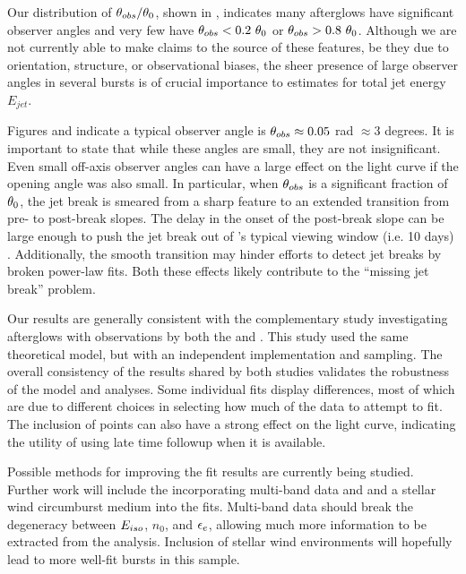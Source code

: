 Our distribution of $\theta_{obs}/\theta_0$, shown in , indicates many afterglows have significant observer angles and very few have $\thobs < 0.2\ \thO$ or $\thobs > 0.8\ \thO$.  Although we are not currently able to make claims to the source of these features, be they due to orientation, structure, or observational biases, the sheer presence of large observer angles in several bursts is of crucial importance to estimates for total jet energy $E_{jet}$.  

Figures  and  indicate a typical observer angle is $\theta_{obs} \approx 0.05$ rad $\approx 3$ degrees.  It is important to state that while these angles are small, they are not insignificant.  Even small off-axis observer angles can have a large effect on the light curve if the opening angle was also small.  In particular, when $\theta_{obs}$ is a significant fraction of $\theta_0$, the jet break is smeared from a sharp feature to an extended transition from pre- to post-break slopes.  The delay in the onset of the post-break slope can be large enough to push the jet break out of \swift{}'s typical viewing window (i.e. 10 days) \citep{vanEer10offaxis, vanEer11}.  Additionally, the smooth transition may hinder efforts to detect jet breaks by broken power-law fits.  Both these effects likely contribute to the  ``missing jet break'' problem.
  
Our results are generally consistent with the complementary study investigating afterglows with observations by both the \swiftXRT{} and \chandra{} \citep{Zhang15}.  This study used the same theoretical model, but with an independent implementation and \multinest{} sampling.  The overall consistency of the results shared by both studies validates the robustness of the model and analyses.  Some individual fits display differences, most of which are due to different choices in selecting how much of the \swiftXRT{} data to attempt to fit.  The inclusion of \chandra{} points can also have a strong effect on the light curve, indicating the utility of using late time followup when it is available.

Possible methods for improving the fit results are currently being studied.  Further work will include the incorporating multi-band data and and a stellar wind circumburst medium into the fits.  Multi-band data should break the degeneracy between $E_{iso}$, $n_0$, and $\epsilon_e$, allowing much more information to be extracted from the analysis.  Inclusion of stellar wind environments will hopefully lead to more well-fit bursts in this sample.


